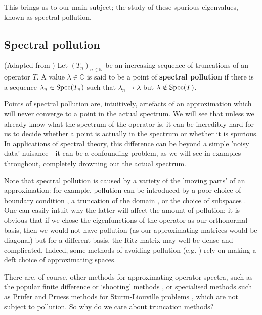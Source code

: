 \documentclass[../main.tex]{subfiles}
\begin{document}
This brings us to our main subject; 
the study of these spurious eigenvalues, known as spectral pollution.

\subsection{Spectral pollution}

\begin{definition}
(Adapted from \parencite{davies1995spectral})
Let $(T_n)_{n \in \mathbb{N}}$ be an increasing sequence of truncations of an
operator $T$. A value $\lambda \in \mathbb{C}$ is said to be a point of
\textbf{spectral pollution} if there is a sequence $\lambda_n \in \mathrm{Spec}(T_n)$
such that $\lambda_n \rightarrow \lambda$ but $\lambda \notin \mathrm{Spec}(T)$.
\end{definition}

Points of spectral pollution are, intuitively, artefacts of an approximation
which will never converge to a point in the actual spectrum. We will see that
unless we already know what the
spectrum of the operator is, it can be incredibly hard for us to decide whether
a point is actually in the spectrum or whether it is
spurious. In applications of spectral theory, this difference can be beyond a
simple 'noisy data' nuisance - it can be a confounding problem, as we will see
in examples throughout, completely drowning out the actual spectrum.

Note that spectral pollution is caused by a variety of the 'moving parts' of
an approximation: for example, pollution can be introduced by a poor choice
of boundary condition \cite{cances2012periodic}, a truncation of the domain
\cite{aceto2006numerical}, or the choice of subspaces \cite{levitin2002spectral}.
One can easily intuit why the latter will affect the amount of pollution; it is
obvious that if we chose the eigenfunctions of the operator as our orthonormal basis,
then we would not have pollution (as our approximating matrices would be diagonal)
but for a different basis, the Ritz matrix may well be dense and complicated. Indeed,
some methods of avoiding pollution (e.g. \cite{boffi1999problem}) rely on making
a deft choice of approximating spaces.

There are, of course, other methods for approximating operator spectra, such as
the popular finite difference or `shooting' methods \cite{suli2003introduction},
or specialised methods such as Pr\"ufer and Pruess methods for Sturm-Liouville
problems \cite{pryce1993numerical}, which are not subject to pollution. So why
do we care about truncation methods?
\end{document}
